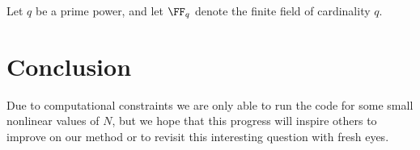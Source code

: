 \documentclass{article}
\begin{document}
Let $q$ be a prime power, and let $\FF_q$ denote the finite field of cardinality $q$.

\section{Conclusion}

Due to computational constraints we are only able to run the code for some small nonlinear values of $N$, but we hope that this progress will inspire others to improve on our method or to revisit this interesting question with fresh eyes.
\end{document}
